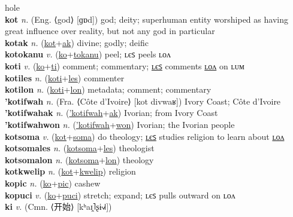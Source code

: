 hole \label{kokilyot} \\
\textbf{kot} \textit{n.} (Eng. ⟨god⟩ [ɡɒd])
god; deity; superhuman entity worshiped as having great influence over reality, but not any god in particular \label{kot} \\
\textbf{kotak} \textit{n.} (\hyperref[kot]{kot}+\hyperref[ak]{ak})
divine; godly; deific \label{kotak} \\
\textbf{kotokanu} \textit{v.} (\hyperref[ko]{ko}+\hyperref[tokanu]{tokanu})
peel; ʟєꜱ peels ʟᴏᴧ \label{kotokanu} \\
\textbf{koti} \textit{v.} (\hyperref[ko]{ko}+\hyperref[ti]{ti})
comment; commentary; \hyperref[kotiles]{ʟєꜱ} comments \hyperref[kotilon]{ʟᴏᴧ} on ʟᴜᴍ \label{koti} \\
\textbf{kotiles} \textit{n.} (\hyperref[koti]{koti}+\hyperref[les]{les})
commenter \label{kotiles} \\
\textbf{kotilon} \textit{n.} (\hyperref[koti]{koti}+\hyperref[lon]{lon})
metadata; comment; commentary \label{kotilon} \\
\textbf{'kotifwah} \textit{n.} (Fra. ⟨Côte d’Ivoire⟩ [kot divwaʁ])
Ivory Coast; Côte d’Ivoire \label{'kotifwah} \\
\textbf{'kotifwahak} \textit{n.} (\hyperref['kotifwah]{'kotifwah}+\hyperref[ak]{ak})
Ivorian; from Ivory Coast \label{'kotifwahak} \\
\textbf{'kotifwahwon} \textit{n.} (\hyperref['kotifwah]{'kotifwah}+\hyperref[won]{won})
Ivorian; the Ivorian people \label{'kotifwahwon} \\
\textbf{kotsoma} \textit{v.} (\hyperref[kot]{kot}+\hyperref[soma]{soma})
do theology; \hyperref[kotsomales]{ʟєꜱ} studies religion to learn about \hyperref[kotsomalon]{ʟᴏᴧ} \label{kotsoma} \\
\textbf{kotsomales} \textit{n.} (\hyperref[kotsoma]{kotsoma}+\hyperref[les]{les})
theologist \label{kotsomales} \\
\textbf{kotsomalon} \textit{n.} (\hyperref[kotsoma]{kotsoma}+\hyperref[lon]{lon})
theology \label{kotsomalon} \\
\textbf{kotkwelip} \textit{n.} (\hyperref[kot]{kot}+\hyperref[kwelip]{kwelip})
religion \label{kotkwelip} \\
\textbf{kopic} \textit{n.} (\hyperref[ko]{ko}+\hyperref[pic]{pic})
cashew \label{kopic} \\
\textbf{kopuci} \textit{v.} (\hyperref[ko]{ko}+\hyperref[puci]{puci})
stretch; expand; ʟєꜱ pulls outward on ʟᴏᴧ \label{kopuci} \\
\textbf{ki} \textit{v.} (Cmn. ⟨开始⟩ [kʰaɪ̯˥ʂɨ˧˩˧])

